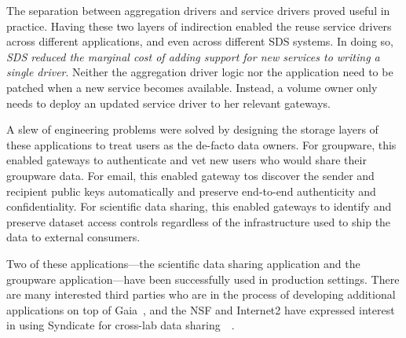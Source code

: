 The separation between aggregation drivers and service drivers proved useful in
practice.  Having these two layers of indirection enabled the reuse service
drivers across different applications, and even across different SDS systems.
In doing so, \emph{SDS reduced the marginal cost of adding support for new
services to writing a single driver}.
Neither the aggregation driver logic nor the application need to be
patched when a new service becomes available.  Instead, a volume owner only
needs to deploy an updated service driver to her relevant gateways.

A slew of engineering problems were solved by
designing the storage layers of these applications to treat users as the
de-facto data owners.
For groupware, this enabled gateways to authenticate and vet new users who would
share their groupware data.  For email, this enabled gateway tos discover the
sender and recipient public keys automatically and preserve end-to-end
authenticity and confidentiality.  For scientific data sharing,
this enabled gateways to identify and preserve dataset access controls regardless of the infrastructure used
to ship the data to external consumers.

Two of these applications---the scientific data sharing application and the
groupware application---have been successfully used in production settings.
There are many interested third parties who are in the process of developing
additional applications on top of Gaia~\cite{blockstack-app-fund}, and the NSF
and Internet2 have expressed interest in using Syndicate for cross-lab data
sharing~\cite{nsf-grant}~\cite{conversation-internet2}.
